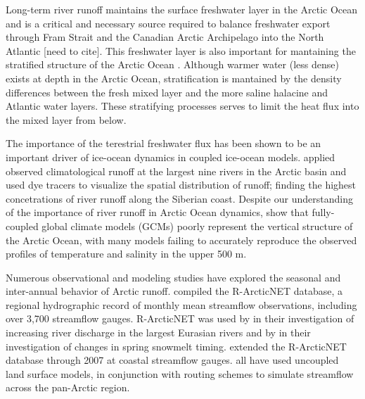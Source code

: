 \documentclass[jgrga, draft]{agutex}
\begin{document}
\begin{article}
Long-term river runoff maintains the surface freshwater layer in the Arctic Ocean and is a critical and necessary source required to balance freshwater export through Fram Strait and the Canadian Arctic Archipelago into the North Atlantic [need to cite].
This freshwater layer is also important for mantaining the stratified structure of the Arctic Ocean \citep{Nummelin_2015}.
Although warmer water (less dense) exists at depth in the Arctic Ocean, stratification is mantained by the density differences between the fresh mixed layer and the more saline halacine and Atlantic water layers.
These stratifying processes serves to limit the heat flux into the mixed layer from below.

The importance of the terestrial freshwater flux has been shown to be an important driver of ice-ocean dynamics in coupled ice-ocean models.
\citet{Newton_2008} applied observed climatological runoff at the largest nine rivers in the Arctic basin and used dye tracers to visualize the spatial distribution of runoff; finding the highest concetrations of river runoff along the Siberian coast.
Despite our understanding of the importance of river runoff in Arctic Ocean dynamics, \citet{Nummelin_2015} show that fully-coupled global climate models (GCMs) poorly represent the vertical structure of the Arctic Ocean, with many models failing to accurately reproduce the observed profiles of temperature and salinity in the upper 500 m.

Numerous observational and modeling studies have explored the seasonal and inter-annual behavior of Arctic runoff.
\citet{Lammers_2001} compiled the R-ArcticNET database, a regional hydrographic record of monthly mean streamflow observations, including over 3,700 streamflow gauges.
R-ArcticNET was used by \citet{Shiklomanov_2009} in their investigation of increasing river discharge in the largest Eurasian rivers and by \citep{Tan_2011} in their investigation of changes in spring snowmelt timing.
\citet{Dai_2009} extended the R-ArcticNET database through 2007 at coastal streamflow gauges.
\citet{Adam_2007, Adam_2008, Su_2007, Dai_2009} all have used uncoupled land surface models, in conjunction with routing schemes to simulate streamflow across the pan-Arctic region.



\end{article}
\end{document}
